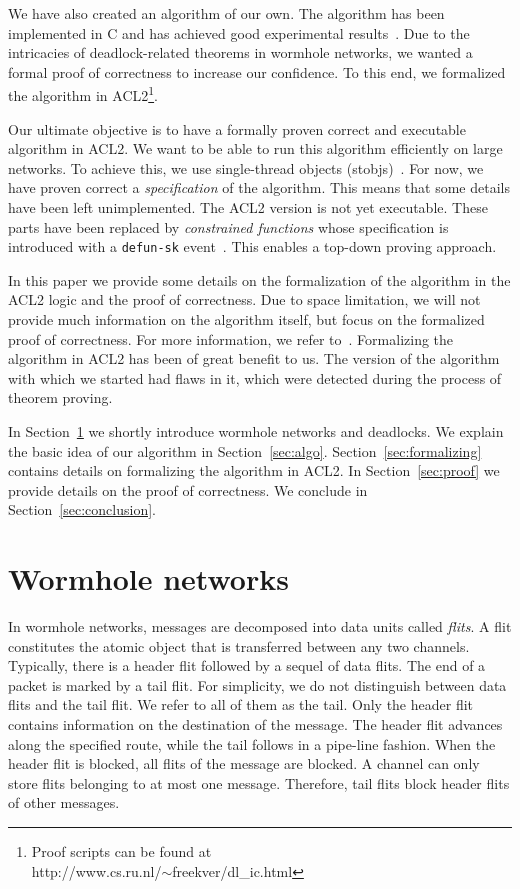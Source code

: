 \documentclass[submission,copyright]{eptcs}
\begin{document}
We have also created an algorithm of our own.
The algorithm has been implemented in C and has achieved good experimental results~\cite{verbeekschmaltz:nocs11}.
Due to the intricacies of deadlock-related theorems in wormhole networks, we wanted a formal proof of correctness to increase our confidence.
To this end, we formalized the algorithm in ACL2\footnote{Proof scripts can be found at \\ http://www.cs.ru.nl/$\sim$freekver/dl\_ic.html}.

Our ultimate objective is to have a formally proven correct and executable algorithm in ACL2.
We want to be able to run this algorithm efficiently on large networks.
To achieve this, we use single-thread objects (stobjs)~\cite{boyer02}.
For now, we have proven correct a \emph{specification} of the algorithm. 
This means that some details have been left unimplemented.
The ACL2 version is not yet executable.
These parts have been replaced by \emph{constrained functions} whose specification is introduced with a {\tt defun-sk} event~\cite{kaufmann01}.
This enables a top-down proving approach.

In this paper we provide some details on the formalization of the algorithm in the ACL2 logic and the proof of correctness.
Due to space limitation, we will not provide much information on the algorithm itself, but focus on the formalized proof of correctness.
For more information, we refer to~\cite{verbeekschmaltz:nocs11}.
Formalizing the algorithm in ACL2 has been of great benefit to us.
The version of the algorithm with which we started had flaws in it, which were detected during the process of theorem proving.

In Section~\ref{sec:wormhole} we shortly introduce wormhole networks and deadlocks.
We explain the basic idea of our algorithm in Section~\ref{sec:algo}.
Section~\ref{sec:formalizing} contains details on formalizing the algorithm in ACL2.
In Section~\ref{sec:proof} we provide details on the proof of correctness.
We conclude in Section~\ref{sec:conclusion}.


\section{Wormhole networks}\label{sec:wormhole}

In wormhole networks, messages are decomposed into data units called \emph{flits}. A flit constitutes the atomic object 
that is transferred between any two channels. Typically, there is a header flit followed by 
a sequel of data flits. The end of a packet is marked by a tail flit. For simplicity, we do 
not distinguish between data flits and the tail flit. We refer to all of them as the tail. Only the header flit contains information on the destination of the message. 
The header flit advances along the specified route, while the tail follows in a pipe-line 
fashion. When the header flit is blocked, all flits of the message are blocked. A channel 
can only store flits belonging to at most one message. Therefore, tail flits block header 
flits of other messages. 
\end{document}
